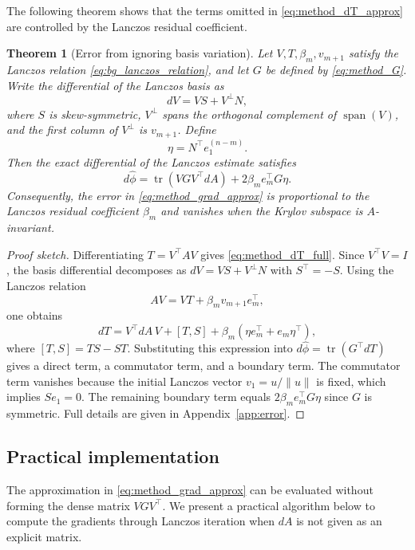 \documentclass{article}
\newtheorem{theorem}{Theorem}
\begin{document}
The following theorem shows that the terms omitted in \eqref{eq:method_dT_approx} are
controlled by the Lanczos residual coefficient.

\begin{theorem}[Error from ignoring basis variation]
\label{thm:method_error}
Let $V,T,\beta_m,v_{m+1}$ satisfy the Lanczos relation
\eqref{eq:bg_lanczos_relation}, and let $G$ be defined by \eqref{eq:method_G}. Write
the differential of the Lanczos basis as
\[
    dV = VS + V^\perp N,
\]
where $S$ is skew-symmetric, $V^\perp$ spans the orthogonal complement of
$\operatorname{span}(V)$, and the first column of $V^\perp$ is $v_{m+1}$. Define
\[
    \eta = N^\top e_1^{(n-m)} .
\]
Then the exact differential of the Lanczos estimate satisfies
\begin{equation}
    d\widehat{\phi}
    =
    \operatorname{tr}\!\left(VGV^\top dA\right)
    +
    2\beta_m e_m^\top G\eta .
    \label{eq:method_error_formula}
\end{equation}
Consequently, the error in \eqref{eq:method_grad_approx} is proportional to the
Lanczos residual coefficient $\beta_m$ and vanishes when the Krylov subspace is
$A$-invariant.
\end{theorem}

\begin{proof}[Proof sketch]
Differentiating $T=V^\top A V$ gives \eqref{eq:method_dT_full}. Since $V^\top V=I$,
the basis differential decomposes as $dV=VS+V^\perp N$ with $S^\top=-S$. Using the
Lanczos relation
\[
    AV = VT+\beta_m v_{m+1}e_m^\top,
\]
one obtains
\[
    dT
    =
    V^\top dA\,V
    +
    [T,S]
    +
    \beta_m(\eta e_m^\top+e_m\eta^\top),
\]
where $[T,S]=TS-ST$. Substituting this expression into
$d\widehat{\phi}=\operatorname{tr}(G^\top dT)$ gives a direct term, a commutator term,
and a boundary term. The commutator term vanishes because the initial Lanczos vector
$v_1=u/\|u\|$ is fixed, which implies $Se_1=0$. The remaining boundary term equals
$2\beta_m e_m^\top G\eta$ since $G$ is symmetric. Full details are given in
Appendix~\ref{app:error}.
\end{proof}


\subsection{Practical implementation}
\label{subsec:method_implementation}

The approximation in \eqref{eq:method_grad_approx} can be evaluated without forming
the dense matrix $VGV^\top$. We present a practical algorithm below to compute the gradients through Lanczos iteration when $dA$ is not given as an explicit matrix.
\end{document}
